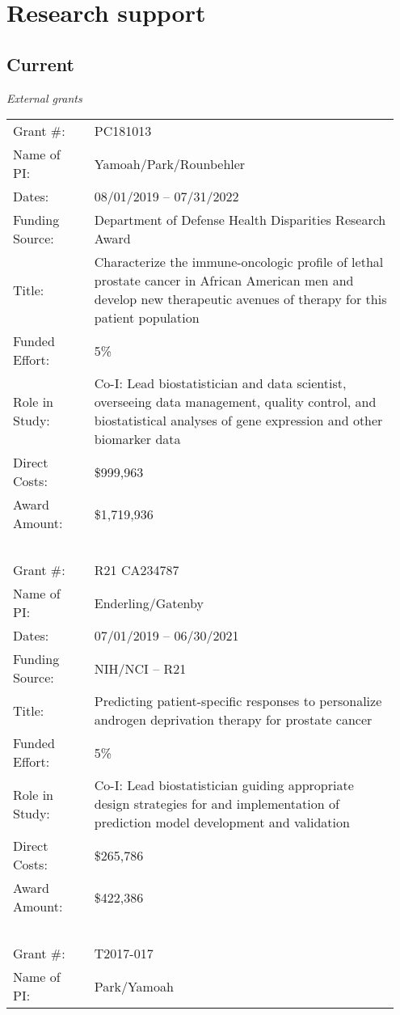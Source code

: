\documentclass[11pt, a4paper]{article} %
\begin{document}

\section*{Research support}
\subsection*{Current}
\emph{External grants}
\begin{longtable}{@{}p{0.2\linewidth} p{0.75\linewidth}}
Grant \#: & PC181013\\
Name of PI: & Yamoah/Park/Rounbehler \\
Dates: & 08/01/2019 -- 07/31/2022\\
Funding Source: & Department of Defense Health Disparities Research Award\\
Title: & Characterize the immune-oncologic profile of lethal prostate cancer in African American men and develop new therapeutic avenues of therapy for this patient population\\
Funded Effort: & 5\%\\
Role in Study: & Co-I: Lead biostatistician and data scientist, overseeing data management, quality control, and biostatistical analyses of gene expression and other biomarker data\\
Direct Costs: & \$999,963\\
Award Amount: & \$1,719,936\\
~\\
Grant \#: & R21 CA234787\\
Name of PI: & Enderling/Gatenby\\
Dates: & 07/01/2019 -- 06/30/2021\\
Funding Source: & NIH/NCI -- R21\\
Title: & Predicting patient-specific responses to personalize androgen deprivation therapy for prostate cancer\\
Funded Effort: & 5\%\\
Role in Study: & Co-I: Lead biostatistician guiding appropriate design strategies for and implementation of prediction model development and validation\\
Direct Costs: & \$265,786\\
Award Amount: & \$422,386\\
~\\
Grant \#: & T2017-017\\ 
Name of PI: & Park/Yamoah\\

\end{longtable}
\end{document}
